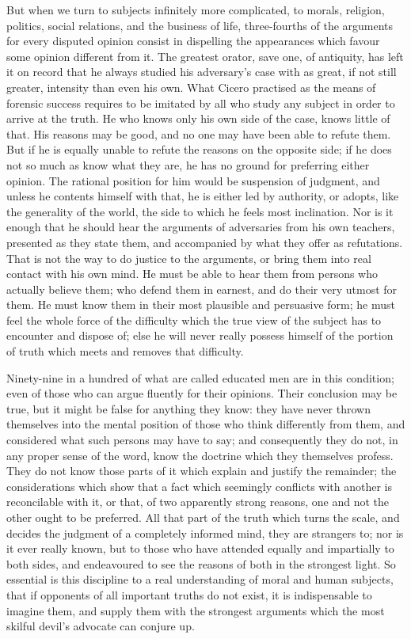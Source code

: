 \documentclass[11pt,openany]{book}
\begin{document}
But when we turn to subjects infinitely more complicated, to morals, religion, politics, social relations, and the business of life, three-fourths of the arguments for every disputed opinion consist in dispelling the appearances which favour some opinion different from it. The greatest orator, save one, of antiquity, has left it on record that he always studied his adversary's case with as great, if not still greater, intensity than even his own. What Cicero practised as the means of forensic success requires to be imitated by all who study any subject in order to arrive at the truth. He who knows only his own side of the case, knows little of that. His reasons may be good, and no one may have been able to refute them. But if he is equally unable to refute the reasons on the opposite side; if he does not so much as know what they are, he has no ground for preferring either opinion. The rational position for him would be suspension of judgment, and unless he contents himself with that, he is either led by authority, or adopts, like the generality of the world, the side to which he feels most inclination. Nor is it enough that he should hear the arguments of adversaries from his own teachers, presented as they state them, and accompanied by what they offer as refutations. That is not the way to do justice to the arguments, or bring them into real contact with his own mind. He must be able to hear them from persons who actually believe them; who defend them in earnest, and do their very utmost for them. He must know them in their most plausible and persuasive form; he must feel the whole force of the difficulty which the true view of the subject has to encounter and dispose of; else he will never really possess himself of the portion of truth which meets and removes that difficulty.

Ninety-nine in a hundred of what are called educated men are in this condition; even of those who can argue fluently for their opinions. Their conclusion may be true, but it might be false for anything they know: they have never thrown themselves into the mental position of those who think differently from them, and considered what such persons may have to say; and consequently they do not, in any proper sense of the word, know the doctrine which they themselves profess. They do not know those parts of it which explain and justify the remainder; the considerations which show that a fact which seemingly conflicts with another is reconcilable with it, or that, of two apparently strong reasons, one and not the other ought to be preferred. All that part of the truth which turns the scale, and decides the judgment of a completely informed mind, they are strangers to; nor is it ever really known, but to those who have attended equally and impartially to both sides, and endeavoured to see the reasons of both in the strongest light. So essential is this discipline to a real understanding of moral and human subjects, that if opponents of all important truths do not exist, it is indispensable to imagine them, and supply them with the strongest arguments which the most skilful devil's advocate can conjure up.
\end{document}
